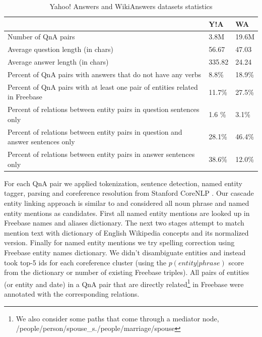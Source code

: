 \begin{table}[ht]
\centering
\caption{Yahoo! Answers and WikiAnswers datasets statistics}
\vspace{-2mm}
\label{table:qna_relextract:cqastats}
\begin{tabular}{|p{12.5cm}||p{1.2cm}|p{1.2cm}|} \hline
& Y!A & WA\\
\hline
Number of QnA pairs & 3.8M & 19.6M \\
Average question length (in chars) & 56.67 & 47.03 \\
Average answer length (in chars) & 335.82 & 24.24 \\
Percent of QnA pairs with answers that do not have any verbs & 8.8\% & 18.9\% \\
Percent of QnA pairs with at least one pair of entities related in Freebase & 11.7\% & 27.5\% \\
Percent of relations between entity pairs in question sentences only & 1.6 \% & 3.1\% \\
Percent of relations between entity pairs in question and answer sentences only & 28.1\% & 46.4\% \\
Percent of relations between entity pairs in answer sentences only & 38.6\%& 12.0\%\\
\hline
\end{tabular}
\end{table}

For each QnA pair we applied tokenization, sentence detection, named entity tagger, parsing and coreference resolution from Stanford CoreNLP \cite{manning-EtAl:2014:P14-5}.
Our cascade entity linking approach is similar to \cite{chang2011stanford} and considered all noun phrase and named entity mentions as candidates.
First all named entity mentions are looked up in Freebase names and aliases dictionary.
The next two stages attempt to match mention text with dictionary of English Wikipedia concepts \cite{spitkovsky2012cross} and its normalized version.
Finally for named entity mentions we try spelling correction using Freebase entity names dictionary.
We didn't disambiguate entities and instead took top-5 ids for each coreference cluster (using the $p(entity|phrase)$ score from the dictionary or number of existing Freebase triples).
All pairs of entities (or entity and date) in a QnA pair that are directly related\footnote{We also consider some paths that come through a mediator node, \eg  /people/person/spouse\_s./people/marriage/spouse} in Freebase were annotated with the corresponding relations.


